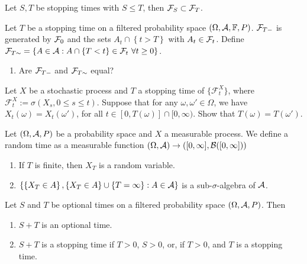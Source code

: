  Let $S, T$ be
stopping times with $S\leq T$, then $\mathcal F_{S} \subset \mathcal F_{T}$.

\solution

Let $T$ be a stopping time on a filtered probability space $(\Omega,\mathcal A, \mathbb F,
P)$.  $\mathcal F_{T-}$ is generated by $\mathcal F_0$ and the sets $A_{t} \cap \left\{ {t>T}
\right\}$ with $A_t \in \mathcal F_t$.  Define $\mathcal F_{T\sim} = \left\{ A \in \mathcal A : A
\cap \left\{ T <t \right\} \in\mathcal F_{t} \ \forall t\geq 0 \right\}$. 
\begin{enumerate}
    \item Are $\mathcal F_{T-}$ and $\mathcal F_{T\sim}$ equal?
\end{enumerate}


Let $ X $ be a stochastic process and $ T $ a stopping time of $\{ \mathcal{F}_t^X \}$, where 
$\mathcal{F}_t^X := \sigma (X_s, 0 \leq s \leq t)$.
Suppose that for any $\omega, \omega' \in \Omega $, we have $X_t(\omega) = X_t(\omega')$,
for all $t \in [0, T(\omega)] \cap [0, \infty)$.
Show that $T(\omega) = T(\omega')$.


Let $(\Omega, \mathcal A, P)$ be a probability space and $X$ a measurable process.  We
define a random time as a measurable function $(\Omega, \mathcal A)\to ([0,\infty], \mathcal B([0,\infty]))$
\begin{enumerate}
    \item If $T$ is finite, then $X_T$ is a random variable. 
    \item $\left\{\left\{ X_T \in A \right\}, \left\{ X_T \in A \right\}\cup \left\{ T=\infty \right\} : A\in\mathcal A \right\}$
        is a sub-$\sigma$-algebra of $\mathcal A$. 
\end{enumerate}

 Let $S$ and $T$ be optional times on a filtered probability
space $\left( \Omega, \mathcal A, P \right)$. Then
\begin{enumerate}
    \item $S+T$ is an optional time.
    \item $S+T$ is a stopping time if $T>0$, $S>0$, or, if $T>0$, and $T$ is a
        stopping time. 
\end{enumerate} %

